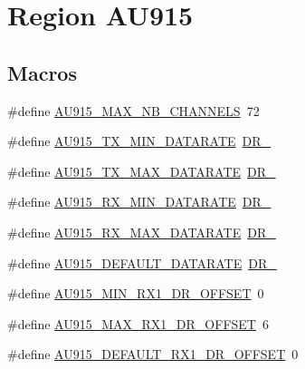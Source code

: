 \hypertarget{group__REGIONAU915}{}\section{Region A\+U915}
\label{group__REGIONAU915}
\subsection*{Macros}
\begin{DoxyCompactItemize}
\item 
\#define \hyperlink{group__REGIONAU915_ga2b76c47d2463a72cc6c69a6384a6de11}{A\+U915\+\_\+\+M\+A\+X\+\_\+\+N\+B\+\_\+\+C\+H\+A\+N\+N\+E\+LS}~72
\item 
\#define \hyperlink{group__REGIONAU915_ga3a7bb744191d2b9daaf6637d36d78422}{A\+U915\+\_\+\+T\+X\+\_\+\+M\+I\+N\+\_\+\+D\+A\+T\+A\+R\+A\+TE}~\hyperlink{group__REGION_ga6c4ef966b4f3d5eb7597b087f2b97095}{D\+R\+\_}
\item 
\#define \hyperlink{group__REGIONAU915_gada67d69eba43730ad99c2a9f00308257}{A\+U915\+\_\+\+T\+X\+\_\+\+M\+A\+X\+\_\+\+D\+A\+T\+A\+R\+A\+TE}~\hyperlink{group__REGION_ga8e2b4c15b7dbb8bda5ed635ca1d262be}{D\+R\+\_}
\item 
\#define \hyperlink{group__REGIONAU915_ga6c3e760e2bc555e4d608ff12d14f6652}{A\+U915\+\_\+\+R\+X\+\_\+\+M\+I\+N\+\_\+\+D\+A\+T\+A\+R\+A\+TE}~\hyperlink{group__REGION_ga44cc96ba80ae464cd9330b784d329c16}{D\+R\+\_}
\item 
\#define \hyperlink{group__REGIONAU915_ga5ce832bce671573a6b6bb4a8358b250e}{A\+U915\+\_\+\+R\+X\+\_\+\+M\+A\+X\+\_\+\+D\+A\+T\+A\+R\+A\+TE}~\hyperlink{group__REGION_ga226f47470cc69a6fe831f7c92709bc1f}{D\+R\+\_}
\item 
\#define \hyperlink{group__REGIONAU915_gaf13e696fe1ca41f523d0a52b0878c278}{A\+U915\+\_\+\+D\+E\+F\+A\+U\+L\+T\+\_\+\+D\+A\+T\+A\+R\+A\+TE}~\hyperlink{group__REGION_ga6c4ef966b4f3d5eb7597b087f2b97095}{D\+R\+\_}
\item 
\#define \hyperlink{group__REGIONAU915_ga7de844f699bceb5022c05f4ed53d63e9}{A\+U915\+\_\+\+M\+I\+N\+\_\+\+R\+X1\+\_\+\+D\+R\+\_\+\+O\+F\+F\+S\+ET}~0
\item 
\#define \hyperlink{group__REGIONAU915_ga6787225088f0c4c8ce35106f5a986f4c}{A\+U915\+\_\+\+M\+A\+X\+\_\+\+R\+X1\+\_\+\+D\+R\+\_\+\+O\+F\+F\+S\+ET}~6
\item 
\#define \hyperlink{group__REGIONAU915_gad91be65b45ba7c349d42b1e564c65251}{A\+U915\+\_\+\+D\+E\+F\+A\+U\+L\+T\+\_\+\+R\+X1\+\_\+\+D\+R\+\_\+\+O\+F\+F\+S\+ET}~0

\end{DoxyCompactItemize}
